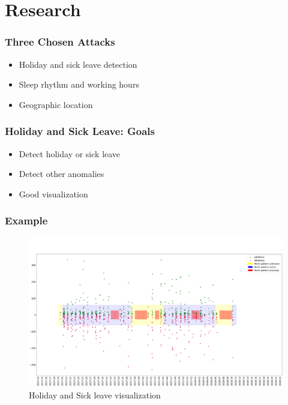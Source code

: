 \documentclass[t]{beamer}
\begin{document}
\section{Research}
\begin{frame}
    \frametitle{Three Chosen Attacks}
    \vspace{1cm}
    \begin{itemize}
        \item Holiday and sick leave detection
        \pause{}
        \item Sleep rhythm and working hours
        \pause{}
        \item Geographic location
    \end{itemize}
\end{frame}

\begin{frame}
    \frametitle{Holiday and Sick Leave: Goals}
    \vspace{1cm}
    \begin{itemize}
        \item Detect holiday or sick leave
        \pause{}
        \item Detect other anomalies
        \pause{}
        \item Good visualization
    \end{itemize}
\end{frame}

\begin{frame}
    \frametitle{Example}
    \begin{figure}[H]
        \includegraphics[scale=0.115]{analysis/work-time-analysis}
        \centering
        \caption{Holiday and Sick leave visualization}
    \end{figure}
\end{frame}
\end{document}

